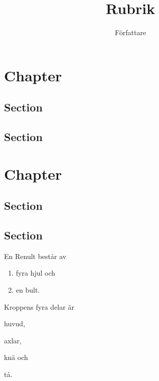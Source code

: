 \documentclass[a4paper, article]{memoir}
\title{Rubrik}
\author{Författare}
\begin{document}
\maketitle

\chapter{Chapter}
\section{Section}
\section{Section}

\chapter{Chapter}
\section{Section}
\section{Section}

En Renult består av
\begin{enumerate}
\item fyra hjul och
\item en bult.
\end{enumerate}
Kroppens fyra delar är
\begin{enumerate*}[label=(\alph*)]
\item huvud,
\item axlar,
\item knä och
\item tå.
\end{enumerate*}
\end{document}
